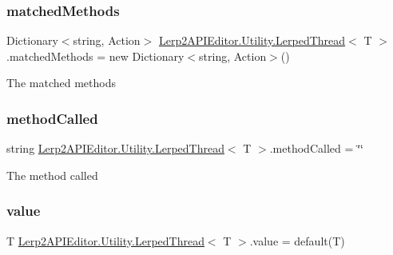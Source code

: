 \subsubsection{\texorpdfstring{matched\+Methods}{matchedMethods}}
{\footnotesize\ttfamily Dictionary$<$string, Action$>$ \hyperlink{class_lerp2_a_p_i_editor_1_1_utility_1_1_lerped_thread}{Lerp2\+A\+P\+I\+Editor.\+Utility.\+Lerped\+Thread}$<$ T $>$.matched\+Methods = new Dictionary$<$string, Action$>$()}



The matched methods 

\mbox{\label{class_lerp2_a_p_i_editor_1_1_utility_1_1_lerped_thread_a9d52b6fa07d8175811ba4df8eb9858ad}} 
\subsubsection{\texorpdfstring{method\+Called}{methodCalled}}
{\footnotesize\ttfamily string \hyperlink{class_lerp2_a_p_i_editor_1_1_utility_1_1_lerped_thread}{Lerp2\+A\+P\+I\+Editor.\+Utility.\+Lerped\+Thread}$<$ T $>$.method\+Called = \char`\"{}\char`\"{}}



The method called 

\mbox{\label{class_lerp2_a_p_i_editor_1_1_utility_1_1_lerped_thread_a65717e0bcfeb29e6ef7e8329e658d61a}} 
\subsubsection{\texorpdfstring{value}{value}}
{\footnotesize\ttfamily T \hyperlink{class_lerp2_a_p_i_editor_1_1_utility_1_1_lerped_thread}{Lerp2\+A\+P\+I\+Editor.\+Utility.\+Lerped\+Thread}$<$ T $>$.value = default(T)}



